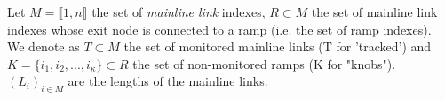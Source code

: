 Let $M=\llbracket 1,n \rrbracket$ the set of \emph{mainline link} indexes, $R\subset{M}$ the set of mainline link indexes whose exit node is connected to a ramp (i.e. the set of ramp indexes). \\
We denote as $T\subset{M}$ the set of monitored mainline links  (T for 'tracked') and $K=\{ i_{1},i_{2},...,i_{\kappa}\}\subset{R}$ the set of non-monitored ramps (K for "knobs").\\
$(L_{i})_{i\in M}$ are the lengths of the mainline links.\\